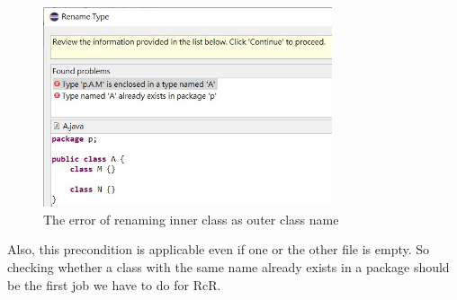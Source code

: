 \begin{figure}[H]
\centerline{\includegraphics[width=85mm,scale=0.5]{NC3.jpg}}
\caption{The error of renaming inner class as outer class name}
\label{fig:NC3}
\end{figure}


Also, this precondition is applicable even if one or the other file is empty. So checking whether a class with the same name already exists in a package should be the first job we have to do for RcR. 
   
